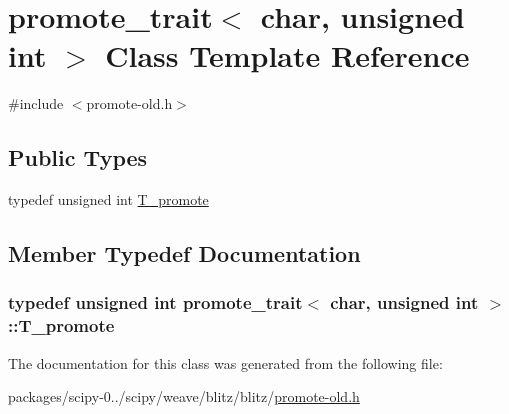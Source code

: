 \hypertarget{classpromote__trait_3_01char_00_01unsigned_01int_01_4}{}\section{promote\+\_\+trait$<$ char, unsigned int $>$ Class Template Reference}
\label{classpromote__trait_3_01char_00_01unsigned_01int_01_4}


{\ttfamily \#include $<$promote-\/old.\+h$>$}

\subsection*{Public Types}
\begin{DoxyCompactItemize}
\item 
typedef unsigned int \hyperlink{classpromote__trait_3_01char_00_01unsigned_01int_01_4_a789ef8c5919139ed119fe96e0f37ea00}{T\+\_\+promote}
\end{DoxyCompactItemize}


\subsection{Member Typedef Documentation}
\hypertarget{classpromote__trait_3_01char_00_01unsigned_01int_01_4_a789ef8c5919139ed119fe96e0f37ea00}{}
\subsubsection[{T\+\_\+promote}]{\setlength{\rightskip}{0pt plus 5cm}typedef unsigned int {\bf promote\+\_\+trait}$<$ char, unsigned int $>$\+::{\bf T\+\_\+promote}}\label{classpromote__trait_3_01char_00_01unsigned_01int_01_4_a789ef8c5919139ed119fe96e0f37ea00}


The documentation for this class was generated from the following file\+:\begin{DoxyCompactItemize}
\item 
packages/scipy-\/0../scipy/weave/blitz/blitz/\hyperlink{promote-old_8h}{promote-\/old.\+h}\end{DoxyCompactItemize}
